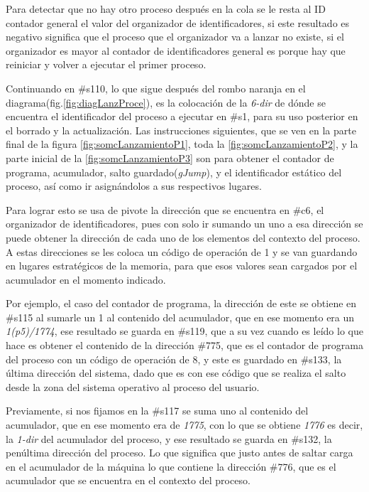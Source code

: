 \documentclass[letterpaper,12pt,oneside]{book}
\begin{document}
        Para detectar que no hay otro proceso después en la cola se le resta al ID contador general el valor del organizador de identificadores, si este resultado
        es negativo significa que el proceso que el organizador va a lanzar no existe, si el organizador es mayor al contador de identificadores general
        es porque hay que reiniciar y volver a ejecutar el primer proceso. 
  
		Continuando en \#s110, lo que sigue después del rombo naranja en el diagrama(fig.\ref{fig:diagLanzProce}), es la colocación
		de la \textit{6-dir} de dónde se encuentra el identificador del proceso a ejecutar en \#s1, para su uso posterior en
		el borrado y la actualización. Las instrucciones siguientes, que se ven en la parte final de la figura  \ref{fig:somcLanzamientoP1},
		toda la \ref{fig:somcLanzamientoP2}, y la parte inicial de la \ref{fig:somcLanzamientoP3} son para obtener el contador de programa, acumulador, salto 
		guardado(\textit{gJump}), y
		el  identificador estático del proceso, así como ir asignándolos  a sus respectivos lugares.
  
        Para lograr esto se usa de pivote la dirección
		que se encuentra en \#c6, el organizador de identificadores, pues con solo ir sumando un uno a esa dirección se puede obtener la dirección de cada uno de los elementos
		del contexto del proceso. A estas direcciones se les coloca un código de operación de 1 y se van guardando en lugares estratégicos de
		la memoria, para que esos valores sean cargados por el acumulador en el momento indicado.
        
        Por ejemplo, el caso del contador de programa,
		la dirección de este se obtiene en \#s115 al sumarle un 1 al contenido del acumulador, que en ese momento era un \textit{1(p5)/1774},  ese resultado se guarda en \#s119, que a su vez cuando es leído lo que hace es obtener el contenido de la dirección \#775, que es
		el contador de programa del proceso con un código de operación de 8, y este es guardado en \#s133, la última dirección del sistema, dado
		que es con ese código que se realiza el salto desde la zona del sistema operativo al proceso del usuario.
		
		Previamente, si nos fijamos en la \#s117 se suma uno al contenido del acumulador, que en ese momento era
		de \textit{1775}, con lo que se obtiene \textit{1776} es decir, la \textit{1-dir} del acumulador del proceso, y ese resultado se guarda
		en \#s132, la penúltima dirección del proceso. Lo que significa que justo antes de saltar carga en el acumulador de la máquina lo que contiene
		la dirección \#776, que es el acumulador que se encuentra en el contexto del proceso.
  
\end{document}
